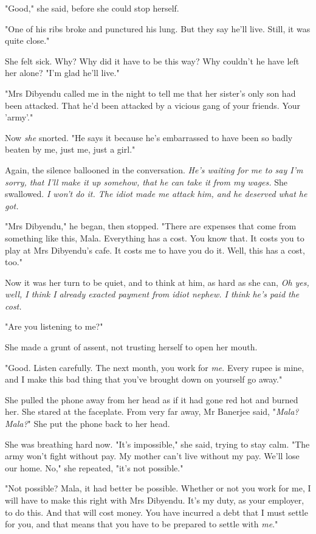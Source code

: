 "Good," she said, before she could stop herself.

"One of his ribs broke and punctured his lung. But they say he'll
live. Still, it was quite close."

She felt sick. Why? Why did it have to be this way? Why couldn't he
have left her alone? "I'm glad he'll live."

"Mrs Dibyendu called me in the night to tell me that her sister's
only son had been attacked. That he'd been attacked by a vicious
gang of your friends. Your 'army'."

Now \emph{she} snorted. "He says it because he's embarrassed to
have been so badly beaten by me, just me, just a girl."

Again, the silence ballooned in the conversation.
\emph{He's waiting for me to say I'm sorry, that I'll make it up somehow, that he can take it from my wages.}
She swallowed.
\emph{I won't do it. The idiot made me attack him, and he deserved what he got.}

"Mrs Dibyendu," he began, then stopped. "There are expenses that
come from something like this, Mala. Everything has a cost. You
know that. It costs you to play at Mrs Dibyendu's cafe. It costs me
to have you do it. Well, this has a cost, too."

Now it was her turn to be quiet, and to think at him, as hard as
she can,
\emph{Oh yes, well, I think I already exacted payment from idiot nephew. I think he's paid the cost.}

"Are you listening to me?"

She made a grunt of assent, not trusting herself to open her
mouth.

"Good. Listen carefully. The next month, you work for \emph{me}.
Every rupee is mine, and I make this bad thing that you've brought
down on yourself go away."

She pulled the phone away from her head as if it had gone red hot
and burned her. She stared at the faceplate. From very far away, Mr
Banerjee said, "\emph{Mala?} \emph{Mala?}" She put the phone back
to her head.

She was breathing hard now. "It's impossible," she said, trying to
stay calm. "The army won't fight without pay. My mother can't live
without my pay. We'll lose our home. No," she repeated, "it's not
possible."

"Not possible? Mala, it had better be possible. Whether or not you
work for me, I will have to make this right with Mrs Dibyendu. It's
my duty, as your employer, to do this. And that will cost money.
You have incurred a debt that I must settle for you, and that means
that you have to be prepared to settle with \emph{me}."

